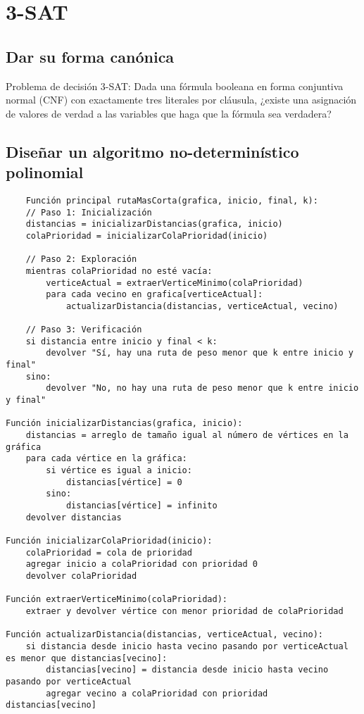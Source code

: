 \section{3-SAT}

\subsection{Dar su forma canónica}

Problema de decisión 3-SAT: Dada una fórmula booleana en forma conjuntiva normal 
(CNF) con exactamente tres literales por cláusula, ¿existe una asignación de valores 
de verdad a las variables que haga que la fórmula sea verdadera?


\subsection{Diseñar un algoritmo no-determinístico polinomial}

\begin{verbatim}
    Función principal rutaMasCorta(grafica, inicio, final, k):
    // Paso 1: Inicialización
    distancias = inicializarDistancias(grafica, inicio)
    colaPrioridad = inicializarColaPrioridad(inicio)
    
    // Paso 2: Exploración
    mientras colaPrioridad no esté vacía:
        verticeActual = extraerVerticeMinimo(colaPrioridad)
        para cada vecino en grafica[verticeActual]:
            actualizarDistancia(distancias, verticeActual, vecino)
    
    // Paso 3: Verificación
    si distancia entre inicio y final < k:
        devolver "Sí, hay una ruta de peso menor que k entre inicio y final"
    sino:
        devolver "No, no hay una ruta de peso menor que k entre inicio y final"

Función inicializarDistancias(grafica, inicio):
    distancias = arreglo de tamaño igual al número de vértices en la gráfica
    para cada vértice en la gráfica:
        si vértice es igual a inicio:
            distancias[vértice] = 0
        sino:
            distancias[vértice] = infinito
    devolver distancias

Función inicializarColaPrioridad(inicio):
    colaPrioridad = cola de prioridad
    agregar inicio a colaPrioridad con prioridad 0
    devolver colaPrioridad

Función extraerVerticeMinimo(colaPrioridad):
    extraer y devolver vértice con menor prioridad de colaPrioridad

Función actualizarDistancia(distancias, verticeActual, vecino):
    si distancia desde inicio hasta vecino pasando por verticeActual es menor que distancias[vecino]:
        distancias[vecino] = distancia desde inicio hasta vecino pasando por verticeActual
        agregar vecino a colaPrioridad con prioridad distancias[vecino]

\end{verbatim}